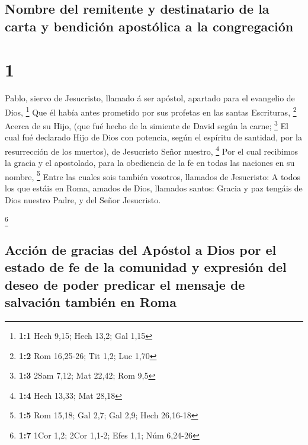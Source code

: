 \hypertarget{nombre-del-remitente-y-destinatario-de-la-carta-y-bendiciuxf3n-apostuxf3lica-a-la-congregaciuxf3n}{%
\subsection{Nombre del remitente y destinatario de la carta y bendición
apostólica a la
congregación}\label{nombre-del-remitente-y-destinatario-de-la-carta-y-bendiciuxf3n-apostuxf3lica-a-la-congregaciuxf3n}}

\hypertarget{section}{%
\section{1}\label{section}}

 Pablo, siervo de Jesucristo, llamado á ser apóstol,
apartado para el evangelio de Dios, \footnote{\textbf{1:1} Hech 9,15;
  Hech 13,2; Gal 1,15}  Que él había antes prometido por
sus profetas en las santas Escrituras, \footnote{\textbf{1:2} Rom
  16,25-26; Tit 1,2; Luc 1,70}  Acerca de su Hijo, (que
fué hecho de la simiente de David según la carne; \footnote{\textbf{1:3}
  2Sam 7,12; Mat 22,42; Rom 9,5}  El cual fué declarado
Hijo de Dios con potencia, según el espíritu de santidad, por la
resurrección de los muertos), de Jesucristo Señor nuestro, \footnote{\textbf{1:4}
  Hech 13,33; Mat 28,18}  Por el cual recibimos la gracia
y el apostolado, para la obediencia de la fe en todas las naciones en su
nombre, \footnote{\textbf{1:5} Rom 15,18; Gal 2,7; Gal 2,9; Hech
  26,16-18}  Entre las cuales sois también vosotros,
llamados de Jesucristo:  A todos los que estáis en Roma,
amados de Dios, llamados santos: Gracia y paz tengáis de Dios nuestro
Padre, y del Señor Jesucristo.

\footnote{\textbf{1:7} 1Cor 1,2; 2Cor 1,1-2; Efes 1,1; Núm 6,24-26}

\hypertarget{acciuxf3n-de-gracias-del-apuxf3stol-a-dios-por-el-estado-de-fe-de-la-comunidad-y-expresiuxf3n-del-deseo-de-poder-predicar-el-mensaje-de-salvaciuxf3n-tambiuxe9n-en-roma}{%
\subsection{Acción de gracias del Apóstol a Dios por el estado de fe de
la comunidad y expresión del deseo de poder predicar el mensaje de
salvación también en
Roma}\label{acciuxf3n-de-gracias-del-apuxf3stol-a-dios-por-el-estado-de-fe-de-la-comunidad-y-expresiuxf3n-del-deseo-de-poder-predicar-el-mensaje-de-salvaciuxf3n-tambiuxe9n-en-roma}}

